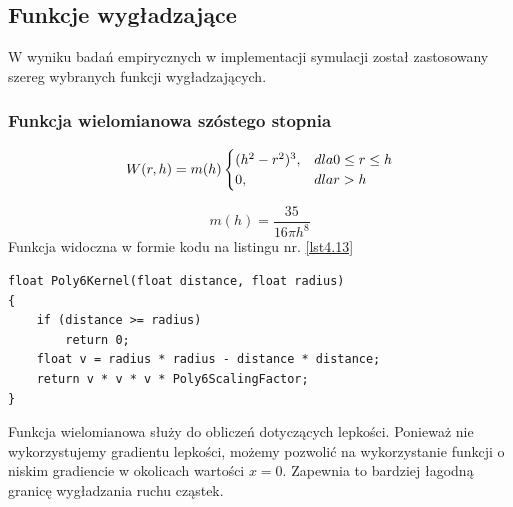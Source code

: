 \documentclass{article}
\begin{document}
\subsection{Funkcje wygładzające}
W wyniku badań empirycznych w implementacji symulacji został zastosowany szereg wybranych funkcji wygładzających.\newline
\subsubsection{Funkcja wielomianowa szóstego stopnia}
\begin{equation}\label{eqn25}
W(r,h) = m(h)
\begin{cases}
(h^2-r^2)^3, & dla \space 0 \leq r \leq h\\
0, & dla \space r > h
\end{cases}
\end{equation}

\begin{center}
\newline
\caption{Rysunek 8: Funkcja wielomianowa szóstego stopnia}
\label{functions_1}
\end{center}

\newline

\begin{equation}\label{eqn26}
m(h) = \frac{35}{16\pi h^8}
\end{equation}
\newline
Funkcja widoczna w formie kodu na listingu nr. \ref{lst4.13}\newline

\begin{lstlisting}[caption=Funkcja wielomianowa szóstego stopnia, label={lst4.13}]
float Poly6Kernel(float distance, float radius)
{
	if (distance >= radius)
		return 0;
	float v = radius * radius - distance * distance;
	return v * v * v * Poly6ScalingFactor;
}
\end{lstlisting}
\noindent
Funkcja wielomianowa służy do obliczeń dotyczących lepkości. Ponieważ nie wykorzystujemy gradientu lepkości, możemy pozwolić na wykorzystanie funkcji o niskim gradiencie w okolicach wartości $x=0$. Zapewnia to bardziej łagodną granicę wygładzania ruchu cząstek.\newline
\end{document}
